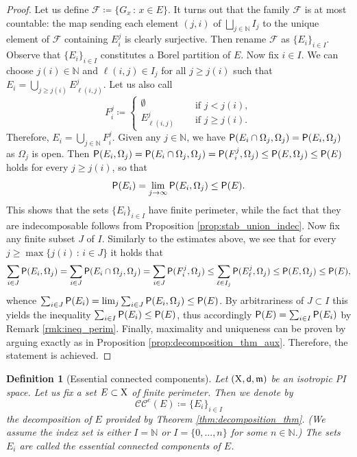 \documentclass[reqno]{amsart}
\numberwithin{equation}{section}
\newcommand{\N}{\mathbb{N}}
\newcommand{\X}{{\rm X}}
\newcommand{\sfd}{{\sf d}}
\newcommand{\mm}{\mathfrak m}
\newcommand{\1}{\mathbbm 1}
\renewcommand{\P}{{\sf P}}
\newcommand{\CC}{\mathcal{CC}^e}
\newtheorem{definition}[theorem]{Definition}
\begin{document}
\begin{proof}
Let us define \(\mathcal F\coloneqq\{G_x\,:\,x\in E\}\). It turns out that
the family \(\mathcal F\) is at most countable: the map sending each element
\((j,i)\) of \(\bigsqcup_{j\in\N}I_j\) to the unique element of \(\mathcal F\)
containing \(E^j_i\) is clearly surjective. Then rename \(\mathcal F\)
as \(\{E_i\}_{i\in I}\). Observe that \(\{E_i\}_{i\in I}\) constitutes
a Borel partition of \(E\). Now fix \(i\in I\). We can choose \(j(i)\in\N\)
and \(\ell(i,j)\in I_j\) for all \(j\geq j(i)\) such that
\(E_i=\bigcup_{j\geq j(i)}E^j_{\ell(i,j)}\). Let us also call
\[
F^j_i\coloneqq\left\{\begin{array}{ll}
\emptyset\\
E^j_{\ell(i,j)}
\end{array}\quad\begin{array}{ll}
\text{ if }j<j(i),\\
\text{ if }j\geq j(i).
\end{array}\right.
\]
Therefore, \(E_i=\bigcup_{j\in\N}F^j_i\). Given any \(j\in\N\), we have
\(\P(E_i\cap\Omega_j,\Omega_j)=\P(E_i,\Omega_j)\) as \(\Omega_j\) is open.
Then \(\P(E_i,\Omega_j)=\P(E_i\cap\Omega_j,\Omega_j)=\P(F^j_i,\Omega_j)
\leq\P(E,\Omega_j)\leq\P(E)\) holds for every \(j\geq j(i)\), so that
\[
\P(E_i)=\lim_{j\to\infty}\P(E_i,\Omega_j)\leq\P(E).
\]
This shows that the sets \(\{E_i\}_{i\in I}\) have finite perimeter, while
the fact that they are indecomposable follows from Proposition
\ref{prop:stab_union_indec}. Now fix any finite subset \(J\) of \(I\).
Similarly to the estimates above, we see that for every
\(j\geq\max\big\{j(i)\,:\,i\in J\big\}\) it holds that
\[
\sum_{i\in J}\P(E_i,\Omega_j)=\sum_{i\in J}\P(E_i\cap\Omega_j,\Omega_j)
=\sum_{i\in J}\P(F^j_i,\Omega_j)\leq\sum_{\ell\in I_j}\P(E^j_\ell,\Omega_j)
\leq\P(E,\Omega_j)\leq\P(E),
\]
whence \(\sum_{i\in J}\P(E_i)=\lim_j\sum_{i\in J}\P(E_i,\Omega_j)\leq\P(E)\).
By arbitrariness of \(J\subset I\) this yields the inequality
\(\sum_{i\in I}\P(E_i)\leq\P(E)\), thus accordingly \(\P(E)=\sum_{i\in I}\P(E_i)\)
by Remark \ref{rmk:ineq_perim}. Finally, maximality and uniqueness can be proven
by arguing exactly as in Proposition \ref{prop:decomposition_thm_aux}. Therefore,
the statement is achieved.
\end{proof}
%
%
\begin{definition}[Essential connected components]
Let \((\X,\sfd,\mm)\) be an isotropic PI space. Let us fix a set \(E\subset\X\)
of finite perimeter. Then we denote by
\[
\CC(E)\coloneqq\{E_i\}_{i\in I}
\]
the decomposition of \(E\) provided by Theorem \ref{thm:decomposition_thm}.
(We assume the index set is either \(I=\N\) or \(I=\{0,\ldots,n\}\)
for some \(n\in\N\).)
The sets \(E_i\) are called the \emph{essential connected components} of \(E\).
\end{definition}
\end{document}
